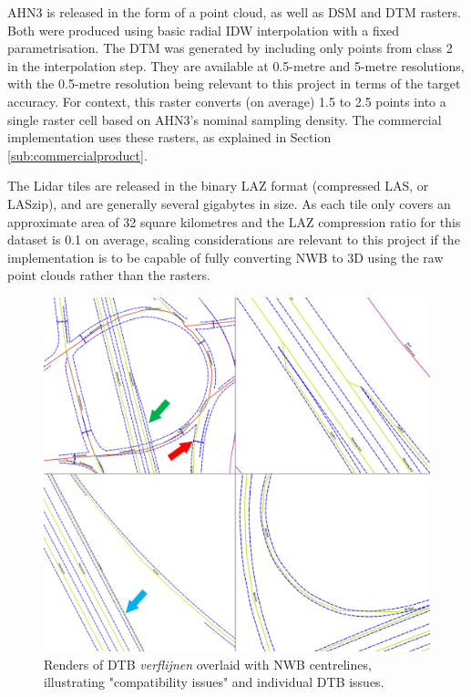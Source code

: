 AHN3 is released in the form of a point cloud, as well as DSM and DTM rasters. Both were produced using basic radial IDW interpolation with a fixed parametrisation. The DTM was generated by including only points from class 2 in the interpolation step. They are available at 0.5-metre and 5-metre resolutions, with the 0.5-metre resolution being relevant to this project in terms of the target accuracy. For context, this raster converts (on average) 1.5 to 2.5 points into a single raster cell based on AHN3's nominal sampling density. The commercial implementation uses these rasters, as explained in Section \ref{sub:commercialproduct}.

The Lidar tiles are released in the binary LAZ format (compressed LAS, or LASzip), and are generally several gigabytes in size. As each tile only covers an approximate area of 32 square kilometres and the LAZ compression ratio for this dataset is 0.1 on average, scaling considerations are relevant to this project if the implementation is to be capable of fully converting NWB to 3D using the raw point clouds rather than the rasters.

\begin{figure}[h!]
    \centering
    \includegraphics[width=0.95\linewidth]{final_report/figs/dtb_sample_07.png} 
    \caption{Renders of DTB \textit{verflijnen} overlaid with NWB centrelines, illustrating "compatibility issues" and individual DTB issues.}
    \label{fig:dtbnwb}
\end{figure}


